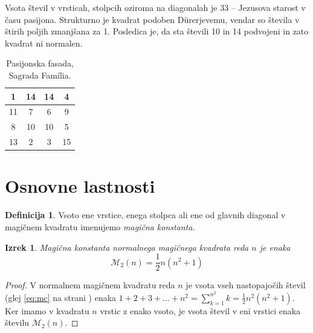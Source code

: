 \documentclass[a4paper,12pt]{article}
\theoremstyle{definition}
\newtheorem{definicija}{Definicija}
\theoremstyle{plain}
\newtheorem{izrek}{Izrek}
\newenvironment{magic}[3]{
   \begin{table}[h]
      \Large
      \centering
      \caption{#1}
      \label{#3}
      \begin{tabular}{|*{#2}{c|}}
         \hline
         }{
      \end{tabular}
   \end{table}
}
\newcommand{\m}{\mathcal{M}_2}
\newcommand{\pojem}[1]{\emph{\color{purple}#1}}
\begin{document}
Vsota števil v vrsticah, stolpcih oziroma na diagonalah je 33 -- Jezusova starost
v času pasijona. Strukturno je kvadrat podoben Dürerjevemu, vendar so števila
v štirih poljih zmanjšana za 1. Posledica je, da sta števili 10 in 14 podvojeni
in zato kvadrat ni normalen.
%






\begin{magic}{Pasijonska fasada, Sagrada Família.}{4}{table:sagrada}
   1 & 14 & 14 &  4 \\\hline
   11 &  7 &  6 &  9 \\\hline
    8 & 10 & 10 &  5 \\\hline
   13 &  2 &  3 & 15 \\\hline
\end{magic}




\section{Osnovne lastnosti}

\begin{definicija}
      Vsoto ene vrstice, enega stolpca ali ene od glavnih diagonal
      v magičnem kvadratu imenujemo \pojem{magična konstanta}.
\end{definicija}

\begin{izrek}
      Magična konstanta normalnega magičnega kvadrata reda $n$
      je enaka
      \begin{equation}
         \m(n) = \frac{1}{2} n(n^2+1)
         \label{eq:mc}
      \end{equation}
\end{izrek}



\begin{proof}
      V normalnem magičnem kvadratu reda $n$ je vsota vseh nastopajočih
      števil (glej \eqref{eq:mc} na strani \pageref{eq:mc}) enaka
      $1+2+3+\dots+n^2=\sum_{k=1}^{n^2}k=\frac{1}{2}n^2(n^2+1)$. Ker imamo
      v kvadratu $n$ vrstic z enako vsoto, je vsota števil v eni vrstici
      enaka številu $\m(n)$. %
\end{proof}
\end{document}

